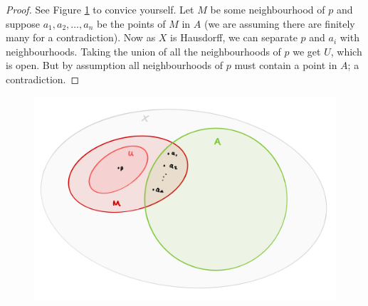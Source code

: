 \begin{proof}
	See Figure \ref{fig:topology-diagram-1} to convice yourself.
	Let $M$ be some neighbourhood of $p$ and suppose $a_1, a_2, \ldots, a_n$
	be the points of $M$ in $A$
	(we are assuming there are finitely many for a contradiction).
	Now as $X$ is Hausdorff, we can separate $p$ and $a_i$ with neighbourhoods.
	Taking the union of all the neighbourhoods of $p$ we get $U$, which is open.
	But by assumption all neighbourhoods of $p$ must contain a point in $A$;
	a contradiction.
\end{proof}

\begin{figure}[htpb]
	\centering
	\includegraphics[width=0.8\linewidth]{topology/images/diagram-1.png}
	\caption{}
	\label{fig:topology-diagram-1}
\end{figure}
